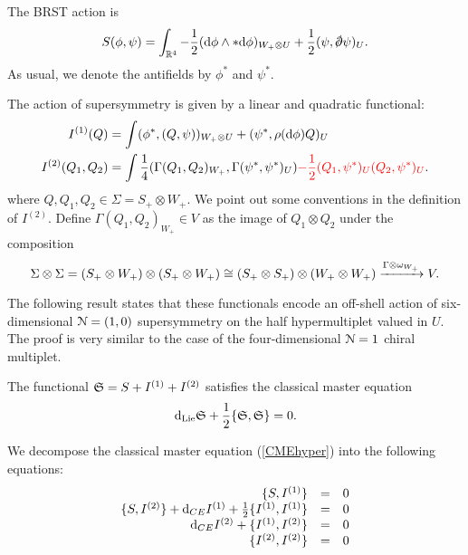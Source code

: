 \documentclass[10pt, oneside]{article}
\begin{document}
The BRST action is
\[
S (\phi, \psi) = \int_{\RR^4} - \frac{1}{2}  (\d \phi \wedge * \d \phi)_{W_+ \otimes U} + \frac{1}{2} (\psi , \sd \dd \psi)_U .
\]
As usual, we denote the antifields by $\phi^*$ and $\psi^*$. 

The action of supersymmetry is given by a linear and quadratic functional:
\begin{align*}
I^{(1)} (Q) & = \int (\phi^*, (Q, \psi))_{W_+ \otimes U} + (\psi^*, \rho({\rm d} \phi) Q)_U \\
I^{(2)} (Q_1 , Q_2) & =  \int \frac{1}{4}(\Gamma(Q_1, Q_2)_{W_+} , \Gamma(\psi^*, \psi^*)_{U}) \textcolor{red}{-\frac{1}{2} (Q_1, \psi^*)_U(Q_2, \psi^*)_U  }.
\end{align*}
where $Q, Q_1,Q_2 \in \Sigma = S_+ \otimes W_+$. 
We point out some conventions in the definition of $I^{(2)}$. 
Define $\Gamma (Q_1,Q_2)_{W_+} \in V$ as the image of $Q_1 \otimes Q_2$ under the composition
\[
\Sigma \otimes \Sigma = (S_+ \otimes W_+) \otimes (S_+ \otimes W_+) \cong (S_+ \otimes S_+) \otimes (W_+ \otimes W_+) \xrightarrow{\Gamma \otimes \omega_{W_+}} V .
\]

The following result states that these functionals encode an off-shell action of six-dimensional $\mathcal N=(1,0)$ supersymmetry on the half hypermultiplet valued in $U$. 
The proof is very similar to the case of the four-dimensional $\mathcal N=1$ chiral multiplet. 

\begin{thm}
The functional $\mathfrak S = S + I^{(1)} + I^{(2)}$ satisfies the classical master equation
\begin{equation}\label{CMEhyper}
{\rm d}_{\rm Lie} \mathfrak S + \frac{1}{2} \{\mathfrak S, \mathfrak S\} = 0 .
\end{equation}
\end{thm}

We decompose the classical master equation (\ref{CMEhyper}) into the following equations:
\begin{equation}\label{CMEhyper2}
\begin{array}{rrrrrr}
\{S , I^{(1)}\} & = & 0 \\ 
\{S, I^{(2)}\} + {\rm d}_{CE} I^{(1)} + \frac{1}{2} \{I^{(1)}, I^{(1)}\} & = & 0 \\
{\rm d}_{CE} I^{(2)} + \{I^{(1)}, I^{(2)}\} & =& 0 \\
\{I^{(2)}, I^{(2)}\} & =& 0
\end{array}
\end{equation}
\end{document}
